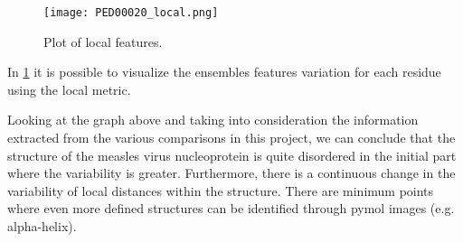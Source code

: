 \begin{figure}[H]
	\begin{minipage}[b]{0.97\textwidth}
		\centering
		\texttt{[image: PED00020\_local.png]}
		\caption{Plot of local features.}
		\label{plot}
	\end{minipage}	
\end{figure}
In \ref{plot} it is possible to visualize the ensembles features variation for each residue using the local metric. 

Looking at the graph above and taking into consideration the information extracted from the various comparisons in this project, we can conclude that the structure of the measles virus nucleoprotein is quite disordered in the initial part where the variability is greater. Furthermore, there is a continuous change in the variability of local distances within the structure. There are minimum points where even more defined structures can be identified through pymol images (e.g. alpha-helix).%